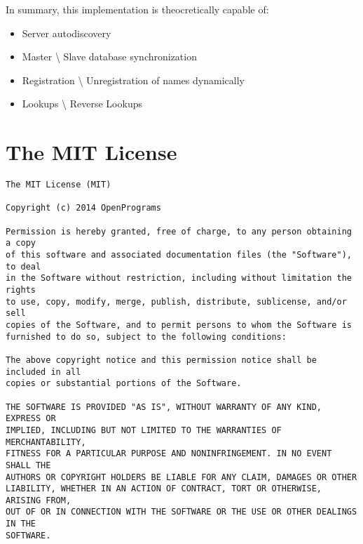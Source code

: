 \documentclass[]{report}
\begin{document}
In summary, this implementation is theocretically capable of:
\begin{itemize}
	\item Server autodiscovery
	\item Master \textbackslash{} Slave database synchronization
	\item Registration \textbackslash{}  Unregistration of names dynamically
	\item Lookups \textbackslash{} Reverse Lookups
\end{itemize}
\appendix
\chapter{The MIT License}\label{mit}
\begin{verbatim}
The MIT License (MIT)

Copyright (c) 2014 OpenPrograms

Permission is hereby granted, free of charge, to any person obtaining a copy
of this software and associated documentation files (the "Software"), to deal
in the Software without restriction, including without limitation the rights
to use, copy, modify, merge, publish, distribute, sublicense, and/or sell
copies of the Software, and to permit persons to whom the Software is
furnished to do so, subject to the following conditions:

The above copyright notice and this permission notice shall be included in all
copies or substantial portions of the Software.

THE SOFTWARE IS PROVIDED "AS IS", WITHOUT WARRANTY OF ANY KIND, EXPRESS OR
IMPLIED, INCLUDING BUT NOT LIMITED TO THE WARRANTIES OF MERCHANTABILITY,
FITNESS FOR A PARTICULAR PURPOSE AND NONINFRINGEMENT. IN NO EVENT SHALL THE
AUTHORS OR COPYRIGHT HOLDERS BE LIABLE FOR ANY CLAIM, DAMAGES OR OTHER
LIABILITY, WHETHER IN AN ACTION OF CONTRACT, TORT OR OTHERWISE, ARISING FROM,
OUT OF OR IN CONNECTION WITH THE SOFTWARE OR THE USE OR OTHER DEALINGS IN THE
SOFTWARE.
\end{verbatim}
\end{document}
